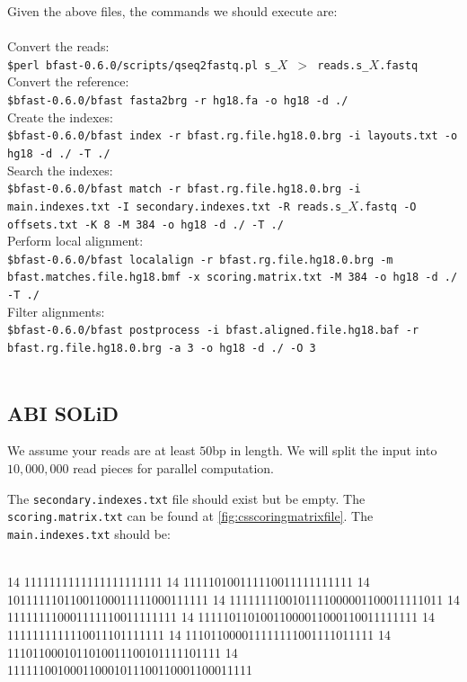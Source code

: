 \documentclass[a4paper,12pt]{book}
\newcommand{\Version}{0.6.0}
\begin{document}
Given the above files, the commands we should execute are:
\\\\
Convert the reads:\\
{\tt \scriptsize \$perl bfast-\Version{}/scripts/qseq2fastq.pl s\_$X$ $>$ reads.s\_$X$.fastq\\}
Convert the reference:\\
{\tt \scriptsize \$bfast-\Version{}/bfast fasta2brg -r hg18.fa -o hg18 -d ./\\}
Create the indexes:\\
{\tt \scriptsize \$bfast-\Version{}/bfast index -r bfast.rg.file.hg18.0.brg -i layouts.txt -o hg18 -d ./ -T ./\\}
Search the indexes:\\
{\tt \scriptsize \$bfast-\Version{}/bfast match -r bfast.rg.file.hg18.0.brg -i main.indexes.txt -I secondary.indexes.txt -R reads.s\_$X$.fastq -O offsets.txt -K 8 -M 384 -o hg18 -d ./ -T ./\\}
Perform local alignment:\\
{\tt \scriptsize \$bfast-\Version{}/bfast localalign -r bfast.rg.file.hg18.0.brg -m bfast.matches.file.hg18.bmf -x scoring.matrix.txt -M 384 -o hg18 -d ./ -T ./\\}
Filter alignments:\\
{\tt \scriptsize \$bfast-\Version{}/bfast postprocess -i bfast.aligned.file.hg18.baf -r bfast.rg.file.hg18.0.brg -a 3 -o hg18 -d ./ -O 3\\}
\\

\subsection{ABI SOLiD}
\label{sec:hg-settings-abi}
We assume your reads are at least $50$bp in length.
We will split the input into $10,000,000$ read pieces for parallel computation.

The {\tt secondary.indexes.txt} file should exist but be empty.
The {\tt scoring.matrix.txt} can be found at \autoref{fig:csscoringmatrixfile}. 
The {\tt main.indexes.txt} should be:\\
\\
\begin{boxedverbatim}
14 1111111111111111111111
14 111110100111110011111111111
14 10111111011001100011111000111111
14 1111111100101111000001100011111011
14 111111110001111110011111111
14 11111011010011000011000110011111111
14 1111111111110011101111111
14 111011000011111111001111011111
14 1110110001011010011100101111101111
14 111111001000110001011100110001100011111
\end{boxedverbatim}
\\
\end{document}
